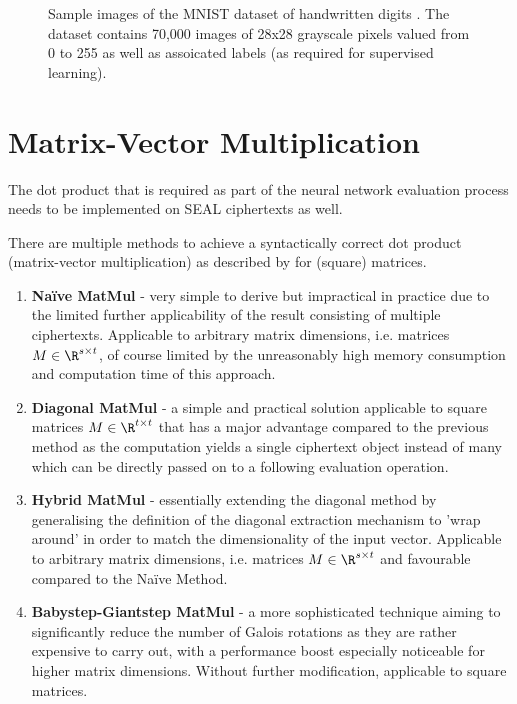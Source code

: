 \begin{figure}[H]
  \centering
  \caption[Sample images of the MNIST dataset]{Sample images of the MNIST dataset of handwritten digits \parencite{mnist-original}. The dataset contains 70,000 images of 28x28 grayscale pixels valued from 0 to 255 as well as assoicated labels (as required for supervised learning).}
\end{figure}

\section{Matrix-Vector Multiplication}
The dot product that is required as part of the neural network evaluation process needs to be implemented on SEAL ciphertexts as well.

There are multiple methods to achieve a syntactically correct dot product (matrix-vector multiplication) as described by \textcite{2018-gazelle} for (square) matrices.

\begin{enumerate}
  \item \textbf{Naïve MatMul} - very simple to derive but impractical in practice due to the limited further
        applicability of the result consisting of multiple ciphertexts. Applicable to arbitrary matrix dimensions,
        i.e. matrices $M \in \R^{s \times t}$, of course limited by the unreasonably high memory consumption
        and computation time of this approach.
  \item \textbf{Diagonal MatMul} - a simple and practical solution applicable to square matrices $M \in \R^{t \times t}$
        that has a major advantage compared to the previous method as the computation yields a
        single ciphertext object instead of many which can be directly passed on to a following evaluation operation.
  \item \textbf{Hybrid MatMul} - essentially extending the diagonal method by generalising the definition of the
        diagonal extraction mechanism to 'wrap around' in order to match the dimensionality of the input vector.
        Applicable to arbitrary matrix dimensions, i.e. matrices $M \in \R^{s \times t}$ and favourable compared
        to the Naïve Method.
  \item \textbf{Babystep-Giantstep MatMul} - a more sophisticated technique aiming to significantly reduce the number of
        Galois rotations as they are rather expensive to carry out,
        with a performance boost especially noticeable for higher matrix dimensions.
        Without further modification, applicable to square matrices.
\end{enumerate}

